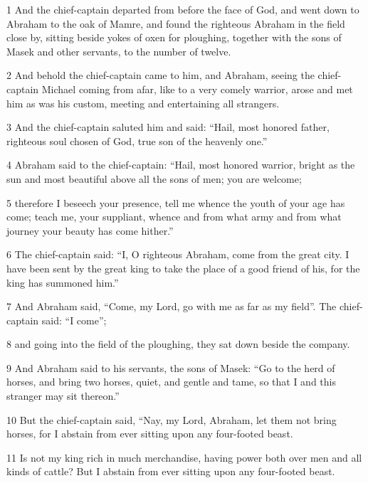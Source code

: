 \par 1 And the chief-captain departed from before the face of God, and went down to Abraham to the oak of Mamre, and found the righteous Abraham in the field close by, sitting beside yokes of oxen for ploughing, together with the sons of Masek and other servants, to the number of twelve. 

\par 2 And behold the chief-captain came to him, and Abraham, seeing the chief-captain Michael coming from afar, like to a very comely warrior, arose and met him as was his custom, meeting and entertaining all strangers. 

\par 3 And the chief-captain saluted him and said: “Hail, most honored father, righteous soul chosen of God, true son of the heavenly one.” 

\par 4 Abraham said to the chief-captain: “Hail, most honored warrior, bright as the sun and most beautiful above all the sons of men; you are welcome; 

\par 5 therefore I beseech your presence, tell me whence the youth of your age has come; teach me, your suppliant, whence and from what army and from what journey your beauty has come hither.” 

\par 6 The chief-captain said: “I, O righteous Abraham, come from the great city. I have been sent by the great king to take the place of a good friend of his, for the king has summoned him.” 

\par 7 And Abraham said, “Come, my Lord, go with me as far as my field”. The chief-captain said: “I come”; 

\par 8 and going into the field of the ploughing, they sat down beside the company. 

\par 9 And Abraham said to his servants, the sons of Masek: “Go to the herd of horses, and bring two horses, quiet, and gentle and tame, so that I and this stranger may sit thereon.” 

\par 10 But the chief-captain said, “Nay, my Lord, Abraham, let them not bring horses, for I abstain from ever sitting upon any four-footed beast. 

\par 11 Is not my king rich in much merchandise, having power both over men and all kinds of cattle? But I abstain from ever sitting upon any four-footed beast. 

